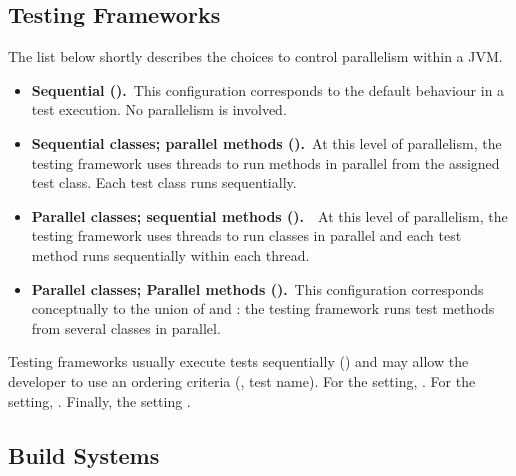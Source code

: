 

\subsection{Testing Frameworks}
\label{sec:frameworks}

The list below shortly describes the choices to control parallelism
within a JVM.

\begin{itemize}
\item
    \textbf{Sequential (\Seq).}~This configuration corresponds to the
        default behaviour in a test execution. No parallelism is
        involved.
\item
    \textbf{Sequential classes; parallel methods
        (\SeqClassParMeth{}).}~At this level of parallelism, the
        testing framework uses threads to run methods in parallel from
        the assigned test class. Each test class runs sequentially.
\item
    \textbf{Parallel classes; sequential methods
        (\ParClassSeqMeth{}).}~~At this level of parallelism, the
        testing framework uses threads to run classes in parallel and
        each test method runs sequentially within each thread.
\item
    \textbf{Parallel classes; Parallel methods
        (\ParClassParMeth).}~This configuration corresponds
        conceptually to the union of \ParClassSeqMeth{} and
        \SeqClassParMeth{}: the testing framework runs test methods
        from several classes in parallel.
\end{itemize}

Testing frameworks usually execute tests sequentially (\Seq{}) and may
allow the developer to use an ordering criteria (\eg, test name).  For
the \SeqClassParMeth{} setting, .
For the \ParClassSeqMeth{} setting, . Finally, the \ParClassParMeth{} setting
.

\subsection{Build Systems}
\label{sec:builder}

